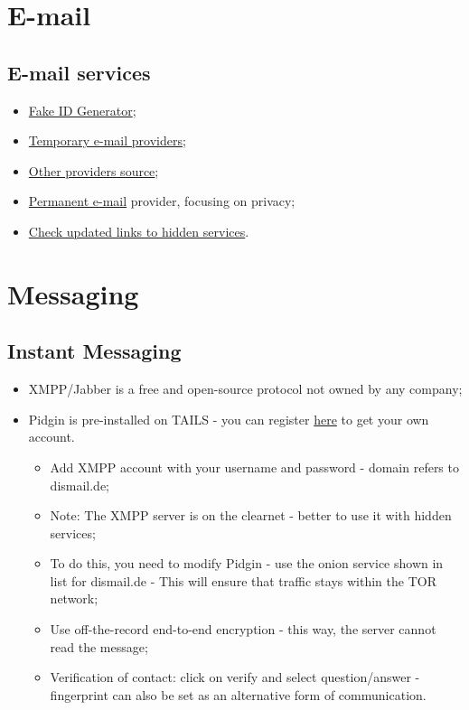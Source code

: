 \documentclass[11pt,a4paper]{report}
\begin{document}
\section{E-mail}
\subsection{E-mail services}
\begin{itemize}
    \item \href{http://fakepersongenerator.com}{Fake ID Generator};
    \item \href{http://guerrillamail.com}{Temporary e-mail providers};
    \item \href{http://gist.github.com/vyach-vasiliev/045af4c70cf2ed35c6091b4705093017}{Other providers source};
    \item \href{http://protonmail.com}{Permanent e-mail} provider, focusing on privacy;
    \item \href{http://onion.live/}{Check updated links to hidden services}.
\end{itemize}

\section{Messaging}
\subsection{Instant Messaging}
\begin{itemize}
    \item XMPP/Jabber is a free and open-source protocol not owned by any company;
    \item Pidgin is pre-installed on TAILS - you can register \href{http://dismail.de}{here} to get your own account.
    \begin{itemize}
        \item Add XMPP account with your username and password - domain refers to dismail.de;
        \item Note: The XMPP server is on the clearnet - better to use it with hidden services;
        \item To do this, you need to modify Pidgin - use the onion service shown in list for dismail.de - This will ensure that traffic stays within the TOR network;
        \item Use off-the-record end-to-end encryption - this way, the server cannot read the message;
        \item Verification of contact: click on verify and select question/answer - fingerprint can also be set as an alternative form of communication.
    \end{itemize}
\end{itemize}
\end{document}
